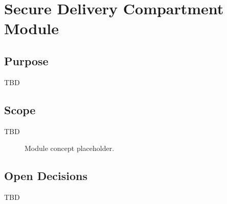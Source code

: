 \chapter{Secure Delivery Compartment Module}

\section{Purpose}

TBD

\section{Scope}

TBD

\begin{figure}[h]
\centering
{}
\caption{Module concept placeholder.}
\end{figure}


\section{Open Decisions}

TBD
